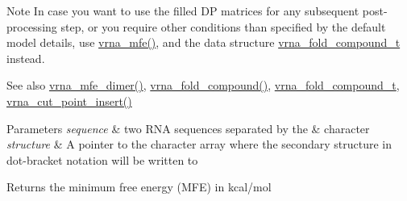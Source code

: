\begin{DoxyNote}{Note}
In case you want to use the filled DP matrices for any subsequent post-\/processing step, or you require other conditions than specified by the default model details, use \hyperlink{group__mfe__global_gabd3b147371ccf25c577f88bbbaf159fd}{vrna\+\_\+mfe()}, and the data structure \hyperlink{group__fold__compound_ga1b0cef17fd40466cef5968eaeeff6166}{vrna\+\_\+fold\+\_\+compound\+\_\+t} instead.
\end{DoxyNote}
\begin{DoxySeeAlso}{See also}
\hyperlink{group__mfe__global_gaab22d10c1190f205f16a77cab9d5d3ee}{vrna\+\_\+mfe\+\_\+dimer()}, \hyperlink{group__fold__compound_ga6601d994ba32b11511b36f68b08403be}{vrna\+\_\+fold\+\_\+compound()}, \hyperlink{group__fold__compound_ga1b0cef17fd40466cef5968eaeeff6166}{vrna\+\_\+fold\+\_\+compound\+\_\+t}, \hyperlink{group__string__utils_ga74f05ece32ea73b59f84a7452afd5fae}{vrna\+\_\+cut\+\_\+point\+\_\+insert()}
\end{DoxySeeAlso}

\begin{DoxyParams}{Parameters}
{\em sequence} & two R\+NA sequences separated by the \textquotesingle{}\&\textquotesingle{} character \\
\hline
{\em structure} & A pointer to the character array where the secondary structure in dot-\/bracket notation will be written to \\
\hline
\end{DoxyParams}
\begin{DoxyReturn}{Returns}
the minimum free energy (M\+FE) in kcal/mol 
\end{DoxyReturn}
